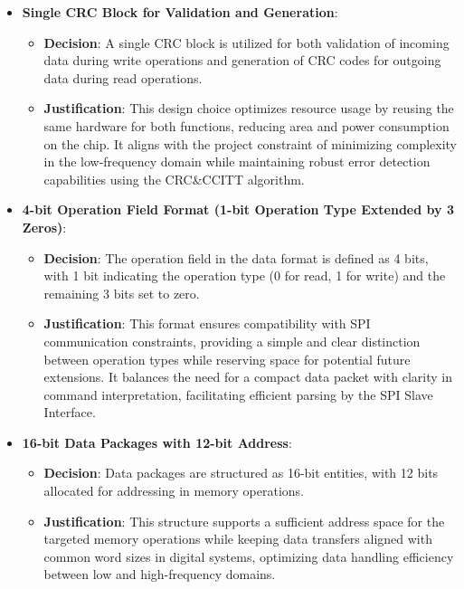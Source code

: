 \begin{itemize}[nosep]
    \item \textbf{Single CRC Block for Validation and Generation}:
        \begin{itemize}[nosep]
            \item \textbf{Decision}: A single CRC block is utilized for both validation of incoming data during write operations and generation of CRC codes for outgoing data during read operations.
            \item \textbf{Justification}: This design choice optimizes resource usage by reusing the same hardware for both functions, reducing area and power consumption on the chip. It aligns with the project constraint of minimizing complexity in the low-frequency domain while maintaining robust error detection capabilities using the CRC\&CCITT algorithm.
        \end{itemize}
    \item \textbf{4-bit Operation Field Format (1-bit Operation Type Extended by 3 Zeros)}:
        \begin{itemize}[nosep]
            \item \textbf{Decision}: The operation field in the data format is defined as 4 bits, with 1 bit indicating the operation type (0 for read, 1 for write) and the remaining 3 bits set to zero.
            \item \textbf{Justification}: This format ensures compatibility with SPI communication constraints, providing a simple and clear distinction between operation types while reserving space for potential future extensions. It balances the need for a compact data packet with clarity in command interpretation, facilitating efficient parsing by the SPI Slave Interface.
        \end{itemize}
    \item \textbf{16-bit Data Packages with 12-bit Address}:
        \begin{itemize}[nosep]
            \item \textbf{Decision}: Data packages are structured as 16-bit entities, with 12 bits allocated for addressing in memory operations.
            \item \textbf{Justification}: This structure supports a sufficient address space for the targeted memory operations while keeping data transfers aligned with common word sizes in digital systems, optimizing data handling efficiency between low and high-frequency domains.
        \end{itemize}
\end{itemize}

